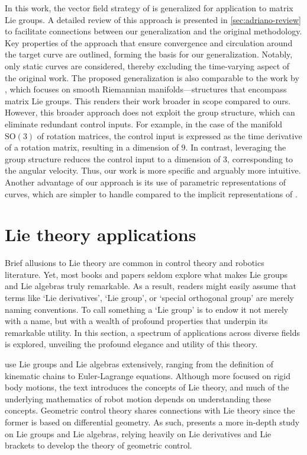 In this work, the vector field strategy of \citet{Rezende2022} is generalized for application to matrix Lie groups. A detailed review of this approach is presented in \cref{sec:adriano-review} to facilitate connections between our generalization and the original methodology. Key properties of the approach that ensure convergence and circulation around the target curve are outlined, forming the basis for our generalization. Notably, only static curves are considered, thereby excluding the time-varying aspect of the original work. The proposed generalization is also comparable to the work by \citet{yao2022topological}, which focuses on smooth Riemannian manifolds---structures that encompass matrix Lie groups. This renders their work broader in scope compared to ours. However, this broader approach does not exploit the group structure, which can eliminate redundant control inputs. For example, in the case of the manifold $\text{SO}(3)$ of rotation matrices, the control input is expressed as the time derivative of a rotation matrix, resulting in a dimension of $9$. In contrast, leveraging the group structure reduces the control input to a dimension of $3$, corresponding to the angular velocity. Thus, our work is more specific and arguably more intuitive. Another advantage of our approach is its use of parametric representations of curves, which are simpler to handle compared to the implicit representations of \citet{yao2022topological}.

\section{Lie theory applications} \label{sec:lit-review-lie-theory}
Brief allusions to Lie theory are common in control theory and robotics literature. Yet, most books and papers seldom explore what makes Lie groups and Lie algebras truly remarkable. As a result, readers might easily assume that terms like `Lie derivatives', `Lie group', or `special orthogonal group' are merely naming conventions. To call something a `Lie group' is to endow it not merely with a name, but with a wealth of profound properties that underpin its remarkable utility. In this section, a spectrum of applications across diverse fields is explored, unveiling the profound elegance and utility of this theory.

\citet{Murray1994} use Lie groups and Lie algebras extensively, ranging from the definition of kinematic chains to Euler-Lagrange equations. Although more focused on rigid body motions, the text introduces the concepts of Lie theory, and much of the underlying mathematics of robot motion depends on understanding these concepts. Geometric control theory shares connections with Lie theory since the former is based on differential geometry. As such, \citet{Bullo2004} presents a more in-depth study on Lie groups and Lie algebras, relying heavily on Lie derivatives and Lie brackets to develop the theory of geometric control.

